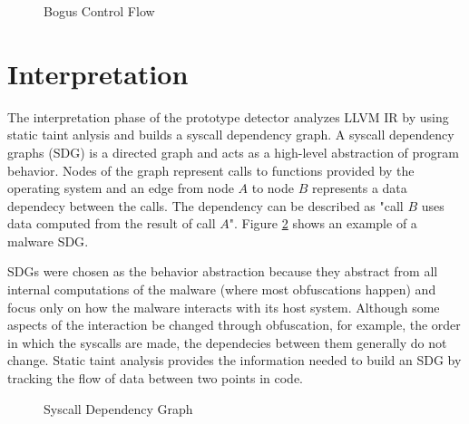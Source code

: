 \begin{figure}[H]
    \centering
    \caption{Bogus Control Flow}
    \label{fig_bcf}
\end{figure}

\section{Interpretation}
\label{s_sdg}
The interpretation phase of the prototype detector analyzes \textsc{LLVM IR} by using static taint anlysis and builds a syscall dependency graph. A syscall dependency graphs (\textsc{SDG}) is a directed graph and acts as a high-level abstraction of program behavior. Nodes of the graph represent calls to functions provided by the operating system and an edge from node $A$ to node $B$ represents a data dependecy between the calls. The dependency can be described as "call $B$ uses data computed from the result of call $A$". Figure \ref{fig_sdg} shows an example of a malware \textsc{SDG}. 

SDGs were chosen as the behavior abstraction because they abstract from all internal computations of the malware (where most obfuscations happen) and focus only on how the malware interacts with its host system. Although some aspects of the interaction be changed through obfuscation, for example, the order in which the syscalls are made, the dependecies between them generally do not change. Static taint analysis provides the information needed to build an \textsc{SDG} by tracking the flow of data between two points in code.

\begin{figure}[H]
    \centering
    \caption{Syscall Dependency Graph}
    \label{fig_sdg}
\end{figure}

